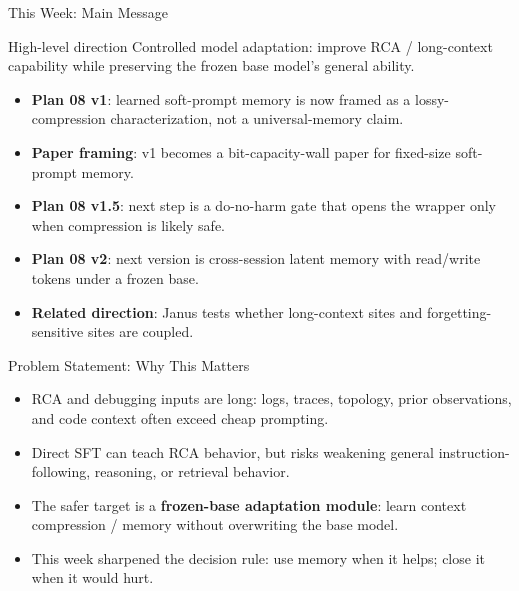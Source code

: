 \begin{frame}{This Week: Main Message}
  \begin{block}{High-level direction}
    Controlled model adaptation: improve RCA / long-context capability while
    preserving the frozen base model's general ability.
  \end{block}
  \begin{itemize}
    \item \textbf{Plan 08 v1}: learned soft-prompt memory is now framed as a
      lossy-compression characterization, not a universal-memory claim.
    \item \textbf{Paper framing}: v1 becomes a bit-capacity-wall paper for
      fixed-size soft-prompt memory.
    \item \textbf{Plan 08 v1.5}: next step is a do-no-harm gate that opens the
      wrapper only when compression is likely safe.
    \item \textbf{Plan 08 v2}: next version is cross-session latent memory with
      read/write tokens under a frozen base.
    \item \textbf{Related direction}: Janus tests whether long-context sites
      and forgetting-sensitive sites are coupled.
  \end{itemize}
\end{frame}

\begin{frame}{Problem Statement: Why This Matters}
  \begin{itemize}
    \item RCA and debugging inputs are long: logs, traces, topology, prior
      observations, and code context often exceed cheap prompting.
    \item Direct SFT can teach RCA behavior, but risks weakening general
      instruction-following, reasoning, or retrieval behavior.
    \item The safer target is a \textbf{frozen-base adaptation module}: learn
      context compression / memory without overwriting the base model.
    \item This week sharpened the decision rule: use memory when it helps;
      close it when it would hurt.
  \end{itemize}
\end{frame}


